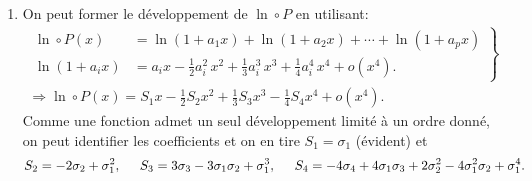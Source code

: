\begin{enumerate}
\begin{enumerate}
  \item On peut former le développement de $\ln \circ P$ en utilisant:
\begin{multline*}
\left. \begin{aligned}
  \ln\circ P(x) &= \ln(1+a_1x) + \ln(1+a_2x) + \cdots + \ln(1+a_px)\\
  \ln(1 + a_ix) &= a_i x - \frac{1}{2}a_i^2\, x^2 + \frac{1}{3}a_i^3\, x^3 + \frac{1}{4}a_i^4\, x^4 + o(x^4).
       \end{aligned}
\right\rbrace \\
\Rightarrow \ln\circ P(x) = S_1x - \frac{1}{2}S_2 x^2 + \frac{1}{3}S_3 x^3 - \frac{1}{4}S_4 x^4 + o(x^4). 
\end{multline*}
Comme une fonction admet un seul développement limité à un ordre donné, on peut identifier les coefficients et on en tire $S_1=\sigma_1$ (évident) et
\[
  S_2 = -2\sigma_2 + \sigma_1^2, \hspace{0.5cm}
  S_3 = 3\sigma_3 - 3 \sigma_1\sigma_2 + \sigma_1^3, \hspace{0.5cm} 
  S_4 = -4\sigma_4 + 4\sigma_1 \sigma_3 + 2 \sigma_2^2 -4\sigma_1^2 \sigma_2 + \sigma_1^4.
\]

\end{enumerate}
\end{enumerate}

